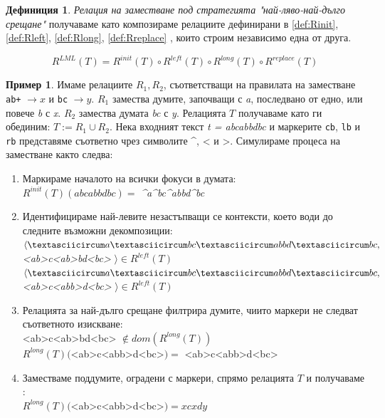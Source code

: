 \documentclass[12pt, oneside]{article}
\theoremstyle{definition}
\newtheorem{definition}{Дефиниция}[section]
\newtheorem{example}{Пример}[section]
\begin{document}
\begin{definition} \emph{Релация на заместване под стратегията "най-ляво-най-дълго срещане"} получаваме като композираме релациите дефинирани в \ref{def:Rinit}, \ref{def:Rleft}, \ref{def:Rlong}, \ref{def:Rreplace} , които строим независимо една от друга.

\[ R^{LML}(T) = R^{init}(T) \circ R^{left}(T) \circ R^{long}(T) \circ R^{replace}(T) \]
\end{definition}

\begin{example}
	Имаме релациите \( R_1, R_2 \), съответстващи на правилата на заместване \verb/ab+/ \( \to x \) и \verb/bc/ \( \to y \). \(R_1\) замества думите, започващи с \emph{a}, последвано от едно, или повече \emph{b} с \emph{x}. \(R_2\) замества думата \emph{bc} с \emph{y}. Релацията \(T\) получаваме като ги обединим: \( T := R_1 \cup R_2 \). Нека входният текст \emph{t = abcabbdbc} и маркерите \verb/cb/, \verb/lb/ и \verb/rb/ представяме съответно чрез символите \textasciicircum, < и >. Симулираме процеса на заместване както следва:
	\begin{enumerate}
		\item Маркираме началото на всички фокуси в думата: \\ \( R^{init}(T)(abcabbdbc) = \) \emph{\textasciicircum a\textasciicircum bc\textasciicircum abbd\textasciicircum bc}
		\item Идентифицираме най-левите незастъпващи се контексти, което води до следните възможни декомпозиции: \\ 
		\( \langle \textasciicircum a\textasciicircum bc\textasciicircum abbd\textasciicircum bc,\) \emph{<ab>c<ab>bd<bc>} \(\rangle \in R^{left}(T) \) \\
		\( \langle \textasciicircum a\textasciicircum bc\textasciicircum abbd\textasciicircum bc,\) \emph{<ab>c<abb>d<bc>} \(\rangle \in R^{left}(T) \)
		\item Релацията за най-дълго срещане филтрира думите, чиито маркери не следват съответното изискване: \\
		<ab>c<ab>bd<bc> \( \notin dom(R^{long}(T)) \) \\
		\( R^{long}(T)(\)<ab>c<abb>d<bc>\() = \) <ab>c<abb>d<bc>
		\item Заместваме поддумите, оградени с маркери, спрямо релацията \(T\) и получаваме : \\
		\( R^{long}(T)(\)<ab>c<abb>d<bc>\() = xcxdy \)
	\end{enumerate}
\end{example}
\end{document}
